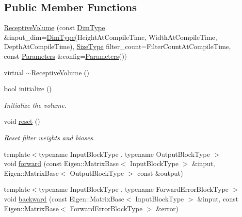 \subsection*{Public Member Functions}
\begin{DoxyCompactItemize}
\item 
\hyperlink{classffnn_1_1layer_1_1_receptive_volume_ac6196e0bdd72e485c5cddd77cb8dc7ef}{Receptive\-Volume} (const \hyperlink{classffnn_1_1layer_1_1internal_1_1_interface_a8d121d0103f254b51e48f7b20a17681f}{Dim\-Type} \&input\-\_\-dim=\hyperlink{classffnn_1_1layer_1_1internal_1_1_interface_a8d121d0103f254b51e48f7b20a17681f}{Dim\-Type}(Height\-At\-Compile\-Time, Width\-At\-Compile\-Time, Depth\-At\-Compile\-Time), \hyperlink{classffnn_1_1layer_1_1internal_1_1_interface_af0567642f60c65b5e87067226a54174b}{Size\-Type} filter\-\_\-count=Filter\-Count\-At\-Compile\-Time, const \hyperlink{structffnn_1_1layer_1_1_receptive_volume_1_1_parameters}{Parameters} \&config=\hyperlink{structffnn_1_1layer_1_1_receptive_volume_1_1_parameters}{Parameters}())
\item 
virtual \hyperlink{classffnn_1_1layer_1_1_receptive_volume_a3d0202e34f98d891958a40c957128c02}{$\sim$\-Receptive\-Volume} ()
\item 
bool \hyperlink{classffnn_1_1layer_1_1_receptive_volume_a0fc5e18276c0f5d9f052d4a92349ca48}{initialize} ()
\begin{DoxyCompactList}\small\item\em Initialize the volume. \end{DoxyCompactList}\item 
void \hyperlink{classffnn_1_1layer_1_1_receptive_volume_affdd2d6fe24078deedb324c979cd08e4}{reset} ()
\begin{DoxyCompactList}\small\item\em Reset filter weights and biases. \end{DoxyCompactList}\item 
{\footnotesize template$<$typename Input\-Block\-Type , typename Output\-Block\-Type $>$ }\\void \hyperlink{classffnn_1_1layer_1_1_receptive_volume_ab4ff3f2b9bc68dfb56d8f01c53a664d8}{forward} (const Eigen\-::\-Matrix\-Base$<$ Input\-Block\-Type $>$ \&input, Eigen\-::\-Matrix\-Base$<$ Output\-Block\-Type $>$ const \&output)
\item 
{\footnotesize template$<$typename Input\-Block\-Type , typename Forward\-Error\-Block\-Type $>$ }\\void \hyperlink{classffnn_1_1layer_1_1_receptive_volume_a58a22d009cc7da6aa08a9e87f81a4eb3}{backward} (const Eigen\-::\-Matrix\-Base$<$ Input\-Block\-Type $>$ \&input, const Eigen\-::\-Matrix\-Base$<$ Forward\-Error\-Block\-Type $>$ \&error)

\end{DoxyCompactItemize}
